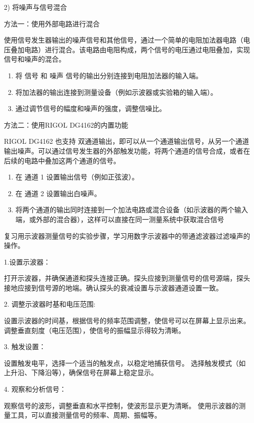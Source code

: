 \documentclass[dvipsnames, svgnames,a4paper,11pt]{article}
\begin{document}
	2) 将噪声与信号混合

	方法一：使用外部电路进行混合

	使用信号发生器输出的噪声信号和其他信号，通过一个简单的电阻加法器电路（电压叠加电路）进行混合。该电路由电阻构成，两个信号的电压通过电阻叠加，实现信号和噪声的混合。
	\begin{enumerate}
		\item  将 信号 和 噪声 信号的输出分别连接到电阻加法器的输入端。
		\item 将加法器的输出连接到测量设备（例如示波器或实验箱的输入端）。
		\item 通过调节信号的幅度和噪声的强度，调整信噪比。
	\end{enumerate}
    
	方法二：使用RIGOL DG4162的内置功能

	RIGOL DG4162 也支持 双通道输出，即可以从一个通道输出信号，从另一个通道输出噪声。可以通过信号发生器的外部触发功能，将两个通道的信号合成，或者在后续的电路中叠加这两个通道的信号。
	\begin{enumerate}
		\item 在 通道 1 设置输出信号（例如正弦波）。
		\item 	在 通道 2 设置输出白噪声。
		\item 将两个通道的输出同时连接到一个加法电路或混合设备（如示波器的两个输入端，或外部的混合器），这样可以直接在同一测量系统中获取混合信号

	\end{enumerate}


	\begin{question}
	复习用示波器测量信号的实验步骤，学习用数字示波器中的带通滤波器过滤噪声的操作。 
	\end{question}

1.设置示波器：

   打开示波器，并确保通道和探头连接正确。探头应接到测量信号的信号源端，探头接地应接到信号源的地端。确认探头的衰减设置与示波器通道设置一致。

2. 调整示波器时基和电压范围:

  设置示波器的时间基，根据信号的频率范围调整，使信号可以在屏幕上显示出来。
  调整垂直刻度（电压范围），使信号的振幅显示得较为清晰。

3. 触发设置：

  设置触发电平，选择一个适当的触发点，以稳定地捕获信号。
 选择触发模式（如上升沿、下降沿等），确保信号在屏幕上稳定显示。

4. 观察和分析信号：

   观察信号的波形，调整垂直和水平控制，使波形显示更为清晰。
   使用示波器的测量工具，可以直接测量信号的频率、周期、振幅等。
\end{document}
